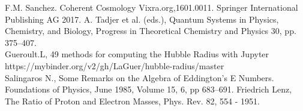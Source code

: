 \documentclass[a4paper,9pt]{article}
\begin{document}
\begin{thebibliography}{99}
 F.M. Sanchez. Coherent Cosmology Vixra.org,1601.0011. Springer International Publishing AG 2017. A. Tadjer et al. (eds.), Quantum Systems in Physics, Chemistry, and Biology, Progress in Theoretical Chemistry and Physics 30, pp. 375--407. \\ 
 Gueroult.L, 49 methods for computing the Hubble Radius with Jupyter https://mybinder.org/v2/gh/LaGuer/hubble-radius/master \\
 Salingaros N., Some Remarks on the Algebra of Eddington's E Numbers. Foundations of Physics, June 1985, Volume 15, 6, pp 683–691.
 Friedrich Lenz, The Ratio of Proton and Electron Masses, Phys. Rev. 82, 554 - 1951.

\end{thebibliography}
\end{document}
